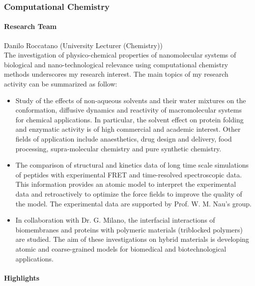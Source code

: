 
\subsubsection{Computational Chemistry }

\paragraph{Research Team}
Danilo Roccatano (University Lecturer (Chemistry)) \\
The investigation of physico-chemical properties of nanomolecular systems of 
biological and nano-technological relevance using computational chemistry 
 methods underscores my research interest. 
The main topics of my research activity can be summarized as follow:

\begin{itemize}
\item Study of the effects of non-aqueous solvents and their water mixtures on the 
conformation, diffusive dynamics and reactivity of macromolecular systems for 
 chemical applications. In particular, the solvent effect on 
protein folding and enzymatic activity is of high commercial and academic interest. 
Other fields of application include anaesthetics, drug 
design and delivery, food processing, supra-molecular chemistry and pure synthetic chemistry. 

\item The comparison of structural and kinetics data of long time scale simulations of 
peptides with experimental FRET and time-resolved spectroscopic data. 
This information provides an atomic model to interpret the 
experimental data and retroactively to optimize the force fields to improve the quality 
of the model. The experimental data are supported by Prof. 
W. M. Nau's group. 
 
\item In collaboration with  Dr. G. Milano, the interfacial interactions of biomembranes and proteins with polymeric materials (triblocked polymers) are studied. The aim of these 
investigations on hybrid materials is developing atomic and coarse-grained models 
for biomedical and biotechnological applications. 

\end{itemize}

\paragraph{Highlights}

